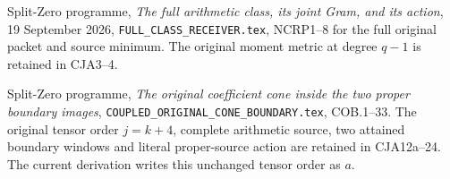 
Split-Zero programme,
\emph{The full arithmetic class, its joint Gram, and its action},
19 September 2026, \texttt{FULL\_CLASS\_RECEIVER.tex},
NCRP1--8 for the full original packet and source minimum.
The original moment metric at degree \(q-1\) is retained in CJA3--4.

Split-Zero programme,
\emph{The original coefficient cone inside the two proper boundary images},
\texttt{COUPLED\_ORIGINAL\_CONE\_BOUNDARY.tex}, COB.1--33.
The original tensor order \(j=k+4\), complete arithmetic source,
two attained boundary windows and literal proper-source action are
retained in CJA12a--24. The current derivation writes this unchanged
tensor order as \(a\).
